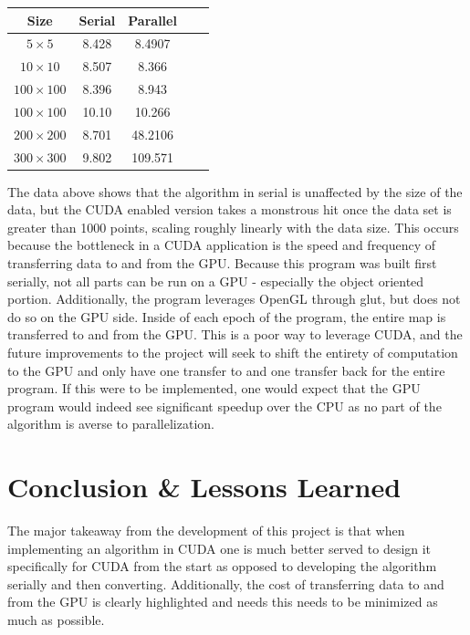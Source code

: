 \documentclass[11pt]{article}
\begin{document}
\begin{table}[!htbp]
\centering
\begin{tabular}{|c|c|c|c|c|}
\hline
	Size & Serial & Parallel \\
\hline
	 \(5 \times 5\) & 8.428 & 8.4907\\
\hline
	 \(10 \times 10\) & 8.507 & 8.366\\
\hline
	 \(100 \times 100\) & 8.396 & 8.943\\
\hline
	\(100 \times 100 \) & 10.10 & 10.266\\
\hline
	\(200 \times 200 \) & 8.701 & 48.2106\\
\hline
	\(300 \times 300 \) & 9.802 & 109.571\\
\hline
\end{tabular}
\end{table}

The data above shows that the algorithm in serial is unaffected by the size of the data, but the CUDA enabled version takes a monstrous hit once the data set is greater than 1000 points, scaling roughly linearly with the data size. This occurs because the bottleneck in a CUDA application is the speed and frequency of transferring data to and from the GPU. Because this program was built first serially, not all parts can be run on a GPU - especially the object oriented portion. Additionally, the program leverages OpenGL through glut, but does not do so on the GPU side. Inside of each epoch of the program, the entire map is transferred to and from the GPU. This is a poor way to leverage CUDA, and the future improvements to the project will seek to shift the entirety of computation to the  GPU and only have one transfer to and one transfer back for the entire program. If this were to be implemented, one would expect that the GPU program would indeed see significant speedup over the CPU as no part of the algorithm is averse to parallelization. 

\section{Conclusion \& Lessons Learned}
The major takeaway from the development of this project is that when implementing an algorithm in CUDA one is much better served to design it specifically for CUDA from the start as opposed to developing the algorithm serially and then converting. Additionally, the cost of transferring data to and from the GPU is clearly highlighted and needs this needs to be minimized as much as possible.
\end{document}
